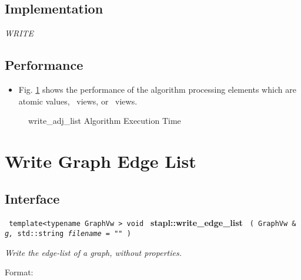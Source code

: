 \subsection{Implementation} \label{sec-wr-adj-list-alg-impl}

\textit{WRITE}

\subsection{Performance} \label{sec-wr-adj-list-alg-perf}

\begin{itemize}
\item
Fig. \ref{fig:wr-adj-list-alg-exec-exper}
shows the performance of the algorithm processing
elements which are atomic values, \stl\ views, or \stapl\ views.
\end{itemize}

\begin{figure}[p]
\caption{ write\_adj\_list Algorithm Execution Time}
\label{fig:wr-adj-list-alg-exec-exper}
\end{figure}


\section{ Write Graph Edge List}
\label{sec-wr-edge-list-alg}

\subsection{Interface} \label{sec-wr-edge-list-alg-inter}

\noindent
\texttt{%
template<typename GraphVw >
\newline
void 
}
\newline
\textbf{stapl::write\_edge\_list}%
\newline
\texttt{%
(
GraphVw \&
\textit{g,}%
std::string
\textit{filename = ""}%
)     
}
\vspace{0.4cm}

\textit{
Write the edge-list of a graph, without properties.
}
\vspace{0.4cm}

Format:

